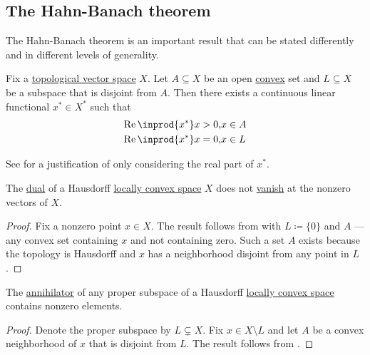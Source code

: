 \subsection{The Hahn-Banach theorem}\label{subsec:hahn_banach}

The Hahn-Banach theorem is an important result that can be stated differently and in different levels of generality.

\begin{theorem}\label{thm:geometric_hahn_banach}
  Fix a \hyperref[def:topological_vector_space]{topological vector space} \( X \). Let \( A \subseteq X \) be an open \hyperref[def:convex_hull]{convex} set and \( L \subseteq X \) be a subspace that is disjoint from \( A \). Then there exists a continuous linear functional \( x^* \in X^* \) such that
  \begin{equation*}
    \begin{aligned}
      \real \inprod{x^*} x > 0, &x \in A \\
      \real \inprod{x^*} x = 0, &x \in L
    \end{aligned}
  \end{equation*}

  See  for a justification of only considering the real part of \( x^* \).
\end{theorem}

\begin{corollary}\label{thm:hahn_banach_implies_functionals_vanish_nowhere}
  The \hyperref[def:dual_vector_space]{dual} of a Hausdorff \hyperref[def:locally_convex_space]{locally convex space} \( X \) does not \hyperref[def:functions_vanish_nowhere]{vanish} at the nonzero vectors of \( X \).
\end{corollary}
\begin{proof}
  Fix a nonzero point \( x \in X \). The result follows from  with \( L \coloneqq \{ 0 \} \) and \( A \) --- any convex set containing \( x \) and not containing zero. Such a set \( A \) exists because the topology is Hausdorff and \( x \) has a neighborhood disjoint from any point in \( L \).
\end{proof}

\begin{corollary}\label{thm:hahn_banach_implies_annihilator_nontrivial}
  The \hyperref[def:vector_space_annihilator]{annihilator} of any proper subspace of a Hausdorff \hyperref[def:locally_convex_space]{locally convex space} contains nonzero elements.
\end{corollary}
\begin{proof}
  Denote the proper subspace by \( L \subsetneq X \). Fix \( x \in X \setminus L \) and let \( A \) be a convex neighborhood of \( x \) that is disjoint from \( L \). The result follows from .
\end{proof}

